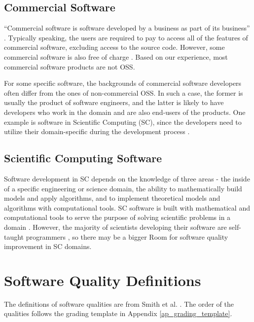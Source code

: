 \subsection{Commercial Software}
``Commercial software is software developed by a business as part of its business'' \cite{GNU2019}.
Typically speaking, the users are required to pay to access all of the features of commercial software, excluding access to the source code. However, some commercial software is also free of charge \cite{GNU2019}. Based on our experience, most commercial software products are not OSS.

For some specific software, the backgrounds of commercial software developers often differ from the ones of non-commercial OSS. In such a case, the former is usually the product of software engineers, and the latter is likely to have developers who work in the domain and are also end-users of the products. One example is software in Scientific Computing (SC), since the developers need to utilize their domain-specific during the development process \cite{WilsonEtAl2014}.

\subsection{Scientific Computing Software}
Software development in SC depends on the knowledge of three areas - the inside of a specific engineering or science domain, the ability to mathematically build models and apply algorithms, and to implement theoretical models and algorithms with computational tools. SC software is built with mathematical and computational tools to serve the purpose of solving scientific problems in a domain \cite{Mehta2015}. However, the majority of scientists developing their software are self-taught programmers \cite{WilsonEtAl2014}, so there may be a bigger Room for software quality improvement in SC domains.

\section{Software Quality Definitions}
\label{sec_software_quality}

The definitions of software qualities are from Smith et al. \cite{SmithEtAl2020}. The order of the qualities follows the grading template in Appendix \ref{ap_grading_template}.

